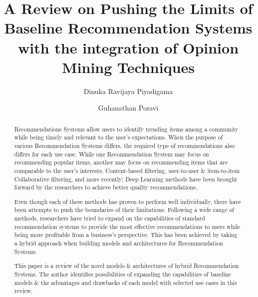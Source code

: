 \documentclass[manuscript,screen,review]{acmart}
\begin{document}
\title{A Review on Pushing the Limits of Baseline Recommendation Systems with the integration of Opinion Mining Techniques}

\author{Dinuka Ravijaya Piyadigama}

\author{Guhanathan Poravi}


\begin{abstract}
 Recommendations Systems allow users to identify trending items among a community while being timely and relevant to the user's expectations. When the purpose of various Recommendation Systems differs, the required type of recommendations also differs for each use case. While one Recommendation System may focus on recommending popular items, another may focus on recommending items that are comparable to the user's interests. Content-based filtering, user-to-user \& item-to-item Collaborative filtering, and more recently; Deep Learning methods have been brought forward by the researchers to achieve better quality recommendations. 

Even though each of these methods has proven to perform well individually, there have been attempts to push the boundaries of their limitations. Following a wide range of methods, researchers have tried to expand on the capabilities of standard recommendation systems to provide the most effective recommendations to users while being more profitable from a business's perspective. This has been achieved by taking a hybrid approach when building models and architectures for Recommendation Systems.

This paper is a review of the novel models \& architectures of hybrid Recommendation Systems. The author identifies possibilities of expanding the capabilities of baseline models \& the advantages and drawbacks of each model with selected use cases in this review.
\end{abstract}
\end{document}
